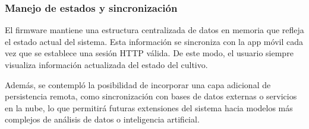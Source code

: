 \subsubsection{Manejo de estados y sincronización}
El firmware mantiene una estructura centralizada de datos en memoria que refleja el estado actual del sistema. Esta información se sincroniza con la app móvil cada vez que se establece una sesión HTTP válida. De este modo, el usuario siempre visualiza información actualizada del estado del cultivo.

Además, se contempló la posibilidad de incorporar una capa adicional de persistencia remota, como sincronización con bases de datos externas o servicios en la nube, lo que permitirá futuras extensiones del sistema hacia modelos más complejos de análisis de datos o inteligencia artificial.



